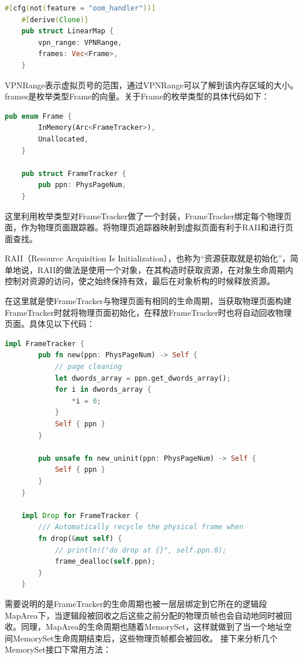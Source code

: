 \begin{lstlisting}[language={Rust}, label={code:LinearMap}, caption={LinearMap}]
	#[cfg(not(feature = "oom_handler"))]
	#[derive(Clone)]
	pub struct LinearMap {
		vpn_range: VPNRange,
		frames: Vec<Frame>,
	}
\end{lstlisting}
VPNRange表示虚拟页号的范围，通过VPNRange可以了解到该内存区域的大小。frames是枚举类型Frame的向量。关于Frame的枚举类型的具体代码如下：

\begin{lstlisting}[language={Rust}, label={code:Frame}, caption={Frame}]
	pub enum Frame {
		InMemory(Arc<FrameTracker>),
		Unallocated,
	}
	
	pub struct FrameTracker {
		pub ppn: PhysPageNum,
	}
\end{lstlisting}

这里利用枚举类型对FrameTracker做了一个封装，FrameTracker绑定每个物理页面，作为物理页面跟踪器。将物理页追踪器映射到虚拟页面有利于RAII和进行页面查找。

RAII（Resource Acquisition Is Initialization），也称为“资源获取就是初始化”，简单地说，RAII的做法是使用一个对象，在其构造时获取资源，在对象生命周期内控制对资源的访问，使之始终保持有效，最后在对象析构的时候释放资源。

在这里就是使FrameTracker与物理页面有相同的生命周期，当获取物理页面构建FrameTracker时就将物理页面初始化，在释放FrameTracker时也将自动回收物理页面。具体见以下代码：

\begin{lstlisting}[language={Rust}, label={code:FrameTracker}, caption={FrameTracker}]
	impl FrameTracker {
		pub fn new(ppn: PhysPageNum) -> Self {
			// page cleaning
			let dwords_array = ppn.get_dwords_array();
			for i in dwords_array {
				*i = 0;
			}
			Self { ppn }
		}
		
		pub unsafe fn new_uninit(ppn: PhysPageNum) -> Self {
			Self { ppn }
		}
	}
	
	impl Drop for FrameTracker {
		/// Automatically recycle the physical frame when
		fn drop(&mut self) {
			// println!("do drop at {}", self.ppn.0);
			frame_dealloc(self.ppn);
		}
	}
\end{lstlisting}

需要说明的是FrameTracker的生命周期也被一层层绑定到它所在的逻辑段MapArea下，当逻辑段被回收之后这些之前分配的物理页帧也会自动地同时被回收。同理，MapArea的生命周期也随着MemorySet，这样就做到了当一个地址空间MemorySet生命周期结束后，这些物理页帧都会被回收。
接下来分析几个MemorySet接口下常用方法：

